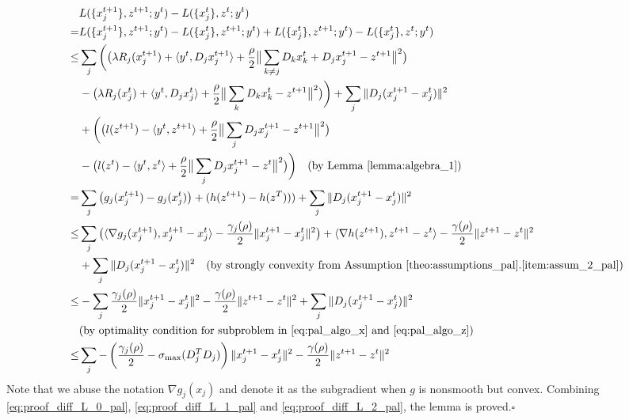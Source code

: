 \begin{align}
    & L(\{x_j^{t+1}\},z^{t+1};y^{t}) - L(\{x_j^{t}\},z^{t};y^{t})\nonumber\\
    = & L(\{x_j^{t+1}\},z^{t+1};y^{t}) - L(\{x_j^{t}\},z^{t+1};y^{t}) + L(\{x_j^{t}\},z^{t+1};y^{t}) - L(\{x_j^{t}\},z^{t};y^{t})\nonumber\\
    \le & \sum_j\bigg(\big(\lambda R_j(x_j^{t+1}) + \langle y^t, D_jx_j^{t+1}\rangle + \frac{\rho}{2}\big\|\sum_{k\neq j}D_kx_k^{t} + D_jx_j^{t+1} - z^{t+1}\big\|^2\big)\nonumber\\
    & - \big(\lambda R_j(x_j^{t}) + \langle y^t, D_jx_j^{t}\rangle + \frac{\rho}{2}\big\|\sum_{k}D_kx_k^{t} - z^{t+1}\big\|^2\big)\bigg)+\sum_j\|D_j(x_j^{t+1} - x_j^t)\|^2\nonumber\\
    & + \bigg(\big(l(z^{t+1}) -\langle y^t, z^{t+1}\rangle + \frac{\rho}{2} \big\|\sum_jD_jx_j^{t+1} - z^{t+1}\big\|^2\big)\nonumber\\
    & -\big(l(z^{t}) -\langle y^t, z^{t}\rangle+ \frac{\rho}{2} \big\|\sum_jD_jx_j^{t+1} - z^{t}\big\|^2\big)\bigg)\quad\text{(by Lemma~\ref{lemma:algebra_1})}\\
    = & \sum_j\big(g_j(x_j^{t+1}) - g_j(x_j^t)\big) + (h(z^{t+1}) - h(z^T)))+\sum_j\|D_j(x_j^{t+1} - x_j^t)\|^2\nonumber\\
    \le & \sum_j \big(\langle \nabla g_j(x_j^{t+1}), x_j^{t+1}-x_j^t\rangle - \frac{\gamma_j(\rho)}{2}\|x_j^{t+1}-x_j^t\|^2\big) + \langle\nabla h(z^{t+1}), z^{t+1} - z^t\rangle - \frac{\gamma(\rho)}{2}\|z^{t+1} - z^t\|^2\nonumber\\
    & +\sum_j\|D_j(x_j^{t+1} - x_j^t)\|^2\quad\text{(by strongly convexity from Assumption~\ref{theo:assumptions_pal}.\ref{item:assum_2_pal})}\nonumber\\
    \le & -\sum_j\frac{\gamma_j(\rho)}{2}\|x_j^{t+1}-x_j^t\|^2 - \frac{\gamma(\rho)}{2}\|z^{t+1} - z^t\|^2+\sum_j\|D_j(x_j^{t+1} - x_j^t)\|^2\nonumber\\
    & \text{(by optimality condition for subproblem in \eqref{eq:pal_algo_x} and \eqref{eq:pal_algo_z})}\nonumber\\
    \le & \sum_j -\left(\frac{\gamma_j(\rho)}{2}-\sigma_{\text{max}}(D_j^T D_j)\right)\|x_j^{t+1} - x_j^t\|^2 - \frac{\gamma(\rho)}{2}\|z^{t+1} - z^t\|^2\label{eq:proof_diff_L_2_pal}
\end{align}
Note that we abuse the notation $\nabla g_j(x_j)$ and denote it as the subgradient when $g$ is nonsmooth but convex. 
Combining \eqref{eq:proof_diff_L_0_pal}, \eqref{eq:proof_diff_L_1_pal} and \eqref{eq:proof_diff_L_2_pal}, the lemma is proved.\hfill$\square$

